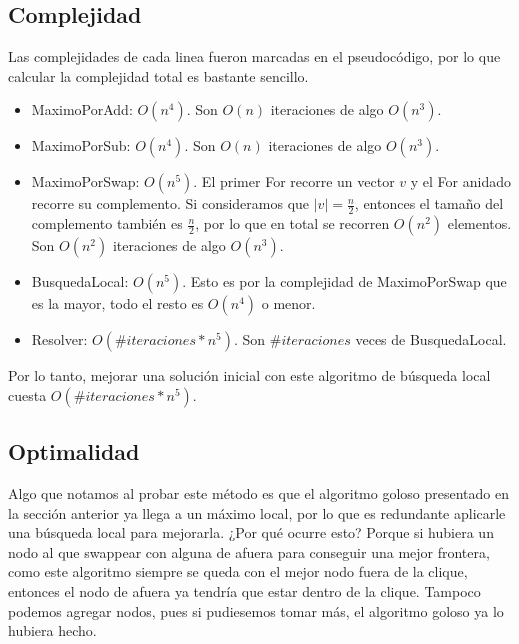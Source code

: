 \subsection{Complejidad}

Las complejidades de cada linea fueron marcadas en el pseudocódigo, por lo que calcular la complejidad total es bastante sencillo.

\begin{itemize}
    \item MaximoPorAdd: $O(n^4)$. Son $O(n)$ iteraciones de algo $O(n^3)$.
    \item MaximoPorSub: $O(n^4)$. Son $O(n)$ iteraciones de algo $O(n^3)$.
    \item MaximoPorSwap: $O(n^5)$. El primer For recorre un vector $v$ y el For anidado recorre su complemento. Si consideramos que $|v| = \frac{n}{2}$, entonces el tamaño del complemento también es $\frac{n}{2}$, por lo que en total se recorren $O(n^2)$ elementos. Son $O(n^2)$ iteraciones de algo $O(n^3)$.
    \item BusquedaLocal: $O(n^5)$. Esto es por la complejidad de MaximoPorSwap que es la mayor, todo el resto es $O(n^4)$ o menor.
    \item Resolver: $O(\#iteraciones * n^5)$. Son $\#iteraciones$ veces de BusquedaLocal.
\end{itemize}

Por lo tanto, mejorar una solución inicial con este algoritmo de búsqueda local cuesta $O(\#iteraciones * n^5)$.

\subsection{Optimalidad}

Algo que notamos al probar este método es que el algoritmo goloso presentado en la sección anterior ya llega a un máximo local, por lo que es redundante aplicarle una búsqueda local para mejorarla. ¿Por qué ocurre esto? Porque si hubiera un nodo al que swappear con alguna de afuera para conseguir una mejor frontera, como este algoritmo siempre se queda con el mejor nodo fuera de la clique, entonces el nodo de afuera ya tendría que estar dentro de la clique. Tampoco podemos agregar nodos, pues si pudiesemos tomar más, el algoritmo goloso ya lo hubiera hecho.  \\


